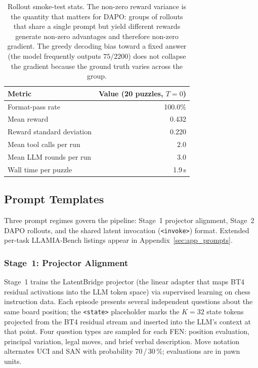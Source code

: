 \begin{table}[h]
\centering
\small
\begin{tabular}{lr}
\toprule
\textbf{Metric} & \textbf{Value (20 puzzles, $T{=}0$)} \\
\midrule
Format-pass rate          & 100.0\% \\
Mean reward               & 0.432 \\
Reward standard deviation & 0.220 \\
Mean tool calls per run   & 2.0 \\
Mean LLM rounds per run   & 3.0 \\
Wall time per puzzle      & 1.9\,s \\
\bottomrule
\end{tabular}
\caption{Rollout smoke-test stats. The non-zero reward variance is the
quantity that matters for DAPO: groups of rollouts that share a single
prompt but yield different rewards generate non-zero advantages and
therefore non-zero gradient. The greedy decoding bias toward a fixed
answer (the model frequently outputs $75/2200$) does not collapse the
gradient because the ground truth varies across the group.}
\label{tab:smoke-stats}
\end{table}

\subsection{Prompt Templates}
\label{app:details:prompts}

Three prompt regimes govern the pipeline: Stage~1 projector alignment, Stage~2 DAPO rollouts, and the shared latent invocation (\texttt{<invoke>}) format. Extended per-task LLAMIA-Bench listings appear in Appendix~\ref{sec:app_prompts}.

\subsubsection{Stage~1: Projector Alignment}
\label{app:details:prompts:stage1}

Stage~1 trains the LatentBridge projector (the linear adapter that maps BT4 residual
activations into the LLM token space) via supervised learning on chess instruction data.
Each episode presents several independent questions about the same board position;
the \texttt{<state>} placeholder marks the $K{=}32$ state tokens projected from the
BT4 residual stream and inserted into the LLM's context at that point.
Four question types are sampled for each FEN: position evaluation, principal
variation, legal moves, and brief verbal description.
Move notation alternates UCI and SAN with probability 70\,/\,30\,\%; evaluations
are in pawn units.


